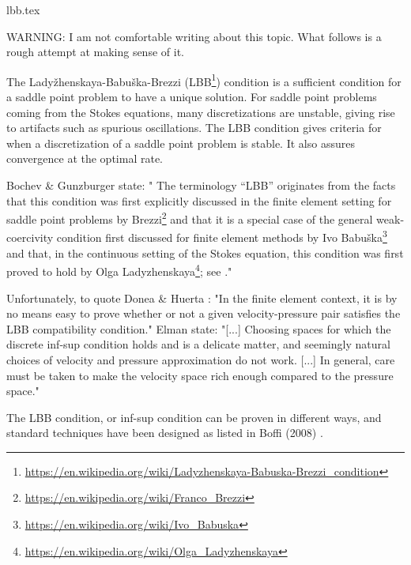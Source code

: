 \begin{flushright} {\tiny {\color{gray} lbb.tex}} \end{flushright}

WARNING: I am not comfortable writing about this topic. What follows is a rough attempt at making sense of it.

\hspace{.4cm}

The Lady{\v z}henskaya-Babu{\v s}ka-Brezzi (LBB\footnote{
\url{https://en.wikipedia.org/wiki/Ladyzhenskaya-Babuska-Brezzi_condition}}) condition is a sufficient 
condition for a saddle point problem to have a unique solution.
For saddle point problems coming from the Stokes equations, 
many discretizations are unstable, giving rise to artifacts such as spurious oscillations. 
The LBB condition gives criteria for when a discretization of a saddle point problem is stable. 
It also assures convergence at the optimal rate. 

Bochev \& Gunzburger \cite{bogu09} state: "
The terminology “LBB” originates from the facts that this condition was first explicitly discussed
in the finite element setting for saddle point problems by Brezzi\footnote{
\url{https://en.wikipedia.org/wiki/Franco_Brezzi}} \cite{brez74} and that it is a special case of
the general weak-coercivity condition first discussed for finite element methods by Ivo Babu{\v s}ka\footnote{
\url{https://en.wikipedia.org/wiki/Ivo_Babuska}}
\cite{babu71} and that, in the continuous setting of the Stokes equation, this condition was first proved to
hold by Olga Ladyzhenskaya\footnote{\url{https://en.wikipedia.org/wiki/Olga_Ladyzhenskaya}}; see \cite{lady69}."

Unfortunately, to quote Donea \& Huerta \cite{dohu03}: 
"In the finite element context, it is by no means easy to prove whether or not a given
velocity-pressure pair satisfies the LBB compatibility condition."
Elman \etal state: "[...] Choosing spaces for which the discrete inf-sup condition holds
and is a delicate matter, and seemingly natural choices of velocity and pressure approximation
do not work. [...] In general, care must be taken to make the velocity space 
rich enough compared to the pressure space."

The LBB condition, or inf-sup condition can be proven in different ways, 
and standard techniques have been designed
as listed in Boffi \etal (2008) \cite{bobf08}.

